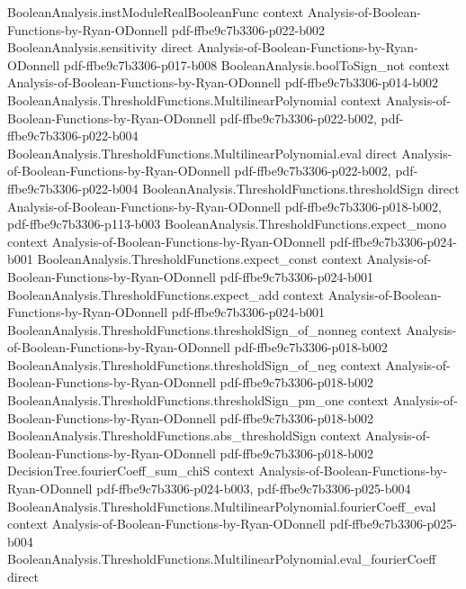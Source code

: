 \begin{lemma}
\proofstep
  {BooleanAnalysis.instModuleRealBooleanFunc}
  {context}
  {Analysis-of-Boolean-Functions-by-Ryan-ODonnell}
  {pdf-ffbe9c7b3306-p022-b002}
\proofstep
  {BooleanAnalysis.sensitivity}
  {direct}
  {Analysis-of-Boolean-Functions-by-Ryan-ODonnell}
  {pdf-ffbe9c7b3306-p017-b008}
\proofstep
  {BooleanAnalysis.boolToSign_not}
  {context}
  {Analysis-of-Boolean-Functions-by-Ryan-ODonnell}
  {pdf-ffbe9c7b3306-p014-b002}
\proofstep
  {BooleanAnalysis.ThresholdFunctions.MultilinearPolynomial}
  {context}
  {Analysis-of-Boolean-Functions-by-Ryan-ODonnell}
  {pdf-ffbe9c7b3306-p022-b002,
    pdf-ffbe9c7b3306-p022-b004}
\proofstep
  {BooleanAnalysis.ThresholdFunctions.MultilinearPolynomial.eval}
  {direct}
  {Analysis-of-Boolean-Functions-by-Ryan-ODonnell}
  {pdf-ffbe9c7b3306-p022-b002,
    pdf-ffbe9c7b3306-p022-b004}
\proofstep
  {BooleanAnalysis.ThresholdFunctions.thresholdSign}
  {direct}
  {Analysis-of-Boolean-Functions-by-Ryan-ODonnell}
  {pdf-ffbe9c7b3306-p018-b002,
    pdf-ffbe9c7b3306-p113-b003}
\proofstep
  {BooleanAnalysis.ThresholdFunctions.expect_mono}
  {context}
  {Analysis-of-Boolean-Functions-by-Ryan-ODonnell}
  {pdf-ffbe9c7b3306-p024-b001}
\proofstep
  {BooleanAnalysis.ThresholdFunctions.expect_const}
  {context}
  {Analysis-of-Boolean-Functions-by-Ryan-ODonnell}
  {pdf-ffbe9c7b3306-p024-b001}
\proofstep
  {BooleanAnalysis.ThresholdFunctions.expect_add}
  {context}
  {Analysis-of-Boolean-Functions-by-Ryan-ODonnell}
  {pdf-ffbe9c7b3306-p024-b001}
\proofstep
  {BooleanAnalysis.ThresholdFunctions.thresholdSign_of_nonneg}
  {context}
  {Analysis-of-Boolean-Functions-by-Ryan-ODonnell}
  {pdf-ffbe9c7b3306-p018-b002}
\proofstep
  {BooleanAnalysis.ThresholdFunctions.thresholdSign_of_neg}
  {context}
  {Analysis-of-Boolean-Functions-by-Ryan-ODonnell}
  {pdf-ffbe9c7b3306-p018-b002}
\proofstep
  {BooleanAnalysis.ThresholdFunctions.thresholdSign_pm_one}
  {context}
  {Analysis-of-Boolean-Functions-by-Ryan-ODonnell}
  {pdf-ffbe9c7b3306-p018-b002}
\proofstep
  {BooleanAnalysis.ThresholdFunctions.abs_thresholdSign}
  {context}
  {Analysis-of-Boolean-Functions-by-Ryan-ODonnell}
  {pdf-ffbe9c7b3306-p018-b002}
\proofstep
  {DecisionTree.fourierCoeff_sum_chiS}
  {context}
  {Analysis-of-Boolean-Functions-by-Ryan-ODonnell}
  {pdf-ffbe9c7b3306-p024-b003,
    pdf-ffbe9c7b3306-p025-b004}
\proofstep
  {BooleanAnalysis.ThresholdFunctions.MultilinearPolynomial.fourierCoeff_eval}
  {context}
  {Analysis-of-Boolean-Functions-by-Ryan-ODonnell}
  {pdf-ffbe9c7b3306-p025-b004}
\proofstep
  {BooleanAnalysis.ThresholdFunctions.MultilinearPolynomial.eval_fourierCoeff}
  {direct}

\end{lemma}
